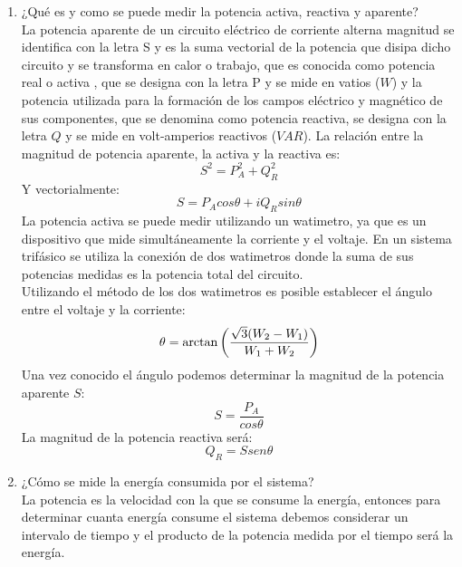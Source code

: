 \documentclass[twocolumn]{IEEEtran}
\begin{document}
\begin{enumerate}
 \item ¿Qué es y como se puede medir la potencia activa, reactiva y aparente?\\
La potencia aparente de un circuito eléctrico de corriente alterna magnitud se identifica con la letra S y es la suma vectorial de la potencia que disipa dicho circuito y se transforma en calor o trabajo, que es conocida como potencia real o activa , que se designa con la letra P y se mide en vatios ($W$) y la potencia utilizada para la formación de los campos eléctrico y magnético de sus componentes, que se denomina como potencia reactiva, se designa con la letra $Q$ y se mide en volt-amperios reactivos ($VAR$). La relación entre la magnitud de  potencia aparente, la activa y la reactiva es:
\begin{equation}
 S^2=P^2_{A}+Q^2_{R}
\label{ecu70}
\end{equation}
\noindent
Y vectorialmente:
\begin{equation}
 S=P_A cos\theta+iQ_R sin\theta
\label{ecu71}
\end{equation}
\noindent
La potencia activa se puede medir utilizando un watimetro, ya que es un dispositivo que mide simultáneamente la corriente y el voltaje. En un sistema trifásico se utiliza la conexión de dos watimetros donde la suma de sus potencias medidas es la potencia total del circuito.\\
Utilizando el método de los dos watimetros es posible establecer el ángulo entre el voltaje y la corriente:
\begin{equation}
 \theta  = {\rm{arctan}}\left( {\frac{{\sqrt 3 ({W_2} - {W_1})}}{{{W_1} + {W_2}}}} \right)
\label{ecu72}
\end{equation}
\noindent
Una vez conocido el ángulo podemos determinar la magnitud de la potencia aparente $S$:
\begin{equation}
 S=\frac{P_A}{cos \theta}
\label{ecu73}
\end{equation}
La magnitud de la potencia reactiva será:
\begin{equation}
 Q_R=S sen \theta
\label{ecu74}
\end{equation}

 \item ¿Cómo se mide la energía consumida por el sistema?\\
La potencia es la velocidad con la que se consume la energía, entonces para determinar cuanta energía consume el sistema debemos considerar un intervalo de tiempo y el producto de la potencia medida por el tiempo será la energía.
\end{enumerate}
\end{document}
